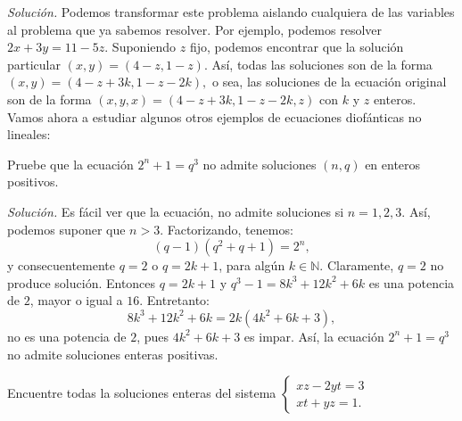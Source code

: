 \documentclass[12pt]{scrartcl}
\begin{document}
\textit{Solución.} Podemos transformar este problema aislando cualquiera de las variables al problema que ya sabemos resolver. Por ejemplo, podemos resolver $2x+3y=11-5z$. Suponiendo $z$ fijo, podemos encontrar que la solución particular $(x,y)=(4-z,1-z)$. Así, todas las soluciones son de la forma $(x,y)=(4-z+3k,1-z-2k),$ o sea, las soluciones de la ecuación original son de la forma $(x,y,x) = (4-z+3k,1-z-2k,z)$ con $k$ y $z$ enteros.\\ 

Vamos ahora a estudiar algunos otros ejemplos de ecuaciones diofánticas no lineales:

\begin{example}
Pruebe que la ecuación $2^n+1=q^3$ no admite soluciones $(n,q)$ en enteros positivos.
\end{example}

\textit{Solución.} Es fácil ver que la ecuación, no admite soluciones si $n=1,2,3$. Así, podemos suponer que $n>3$. Factorizando, tenemos: $$(q-1)(q^2+q+1)=2^n,$$ y consecuentemente $q=2$ o $q=2k+1$, para algún $k\in \mathbb{N}$. Claramente, $q=2$ no produce solución. Entonces $q=2k+1$ y $q^3-1=8k^3+12k^2+6k$ es una potencia de $2$, mayor o igual a $16$. Entretanto: $$8k^3+12k^2+6k=2k(4k^2+6k+3),$$ no es una potencia de $2$, pues $4k^2+6k+3$ es impar. Así, la ecuación $2^n+1=q^3$ no admite soluciones enteras positivas.

\begin{example}[URSS 1991]
Encuentre todas la soluciones enteras del sistema $\left\lbrace \begin{array}{c}
xz-2yt=3 \\xt+yz=1.
\end{array}\right.$
\end{example}
\end{document}
